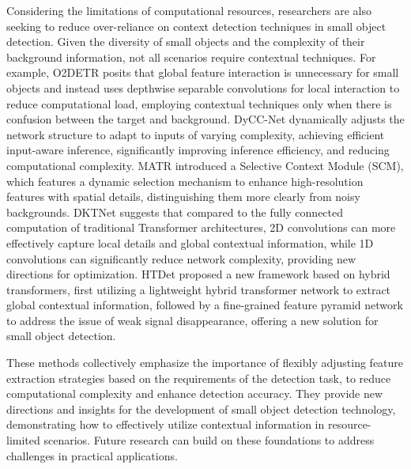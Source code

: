 \documentclass[journal]{IEEEtran}
\begin{document}
Considering the limitations of computational resources, researchers are also seeking to reduce over-reliance on context detection techniques in small object detection. Given the diversity of small objects and the complexity of their background information, not all scenarios require contextual techniques. For example, O2DETR\cite{ma2021oriented} posits that global feature interaction is unnecessary for small objects and instead uses depthwise separable convolutions for local interaction to reduce computational load, employing contextual techniques only when there is confusion between the target and background. DyCC-Net\cite{xi2022dycc} dynamically adjusts the network structure to adapt to inputs of varying complexity, achieving efficient input-aware inference, significantly improving inference efficiency, and reducing computational complexity. MATR\cite{sun2022multi} introduced a Selective Context Module (SCM), which features a dynamic selection mechanism to enhance high-resolution features with spatial details, distinguishing them more clearly from noisy backgrounds. DKTNet\cite{xu2023dktnet} suggests that compared to the fully connected computation of traditional Transformer architectures, 2D convolutions can more effectively capture local details and global contextual information, while 1D convolutions can significantly reduce network complexity, providing new directions for optimization. HTDet\cite{chen2023htdet} proposed a new framework based on hybrid transformers, first utilizing a lightweight hybrid transformer network to extract global contextual information, followed by a fine-grained feature pyramid network to address the issue of weak signal disappearance, offering a new solution for small object detection.

These methods collectively emphasize the importance of flexibly adjusting feature extraction strategies based on the requirements of the detection task, to reduce computational complexity and enhance detection accuracy. They provide new directions and insights for the development of small object detection technology, demonstrating how to effectively utilize contextual information in resource-limited scenarios. Future research can build on these foundations to address challenges in practical applications.
\end{document}
